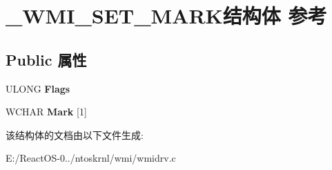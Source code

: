 \hypertarget{struct___w_m_i___s_e_t___m_a_r_k}{}\section{\+\_\+\+W\+M\+I\+\_\+\+S\+E\+T\+\_\+\+M\+A\+R\+K结构体 参考}
\label{struct___w_m_i___s_e_t___m_a_r_k}
\subsection*{Public 属性}
\begin{DoxyCompactItemize}
\item 
\mbox{\label{struct___w_m_i___s_e_t___m_a_r_k_ac3b8e9e352cd467cf6356bfd65ac8a54}} 
U\+L\+O\+NG {\bfseries Flags}
\item 
\mbox{\label{struct___w_m_i___s_e_t___m_a_r_k_ae91f18e24cb2ade3bf0d56028e2e8170}} 
W\+C\+H\+AR {\bfseries Mark} \mbox{[}1\mbox{]}
\end{DoxyCompactItemize}


该结构体的文档由以下文件生成\+:\begin{DoxyCompactItemize}
\item 
E\+:/\+React\+O\+S-\/0../ntoskrnl/wmi/wmidrv.\+c\end{DoxyCompactItemize}
